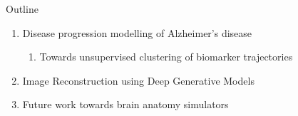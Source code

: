\documentclass[8pt,xcolor=table,aspectratio=169]{beamer}
\begin{document}
\begin{frame}{Outline}




\begin{enumerate}
 \item Disease progression modelling of Alzheimer's disease 
 \begin{enumerate} 
  \item Towards unsupervised clustering of biomarker trajectories\\
 \end{enumerate}
   
 
  
  \vt

 \item Image Reconstruction using Deep Generative Models\\
\brgmoursshort
\vt
 
  \item Future work towards brain anatomy simulators\\

\end{enumerate}
 


\end{frame}
\end{document}
